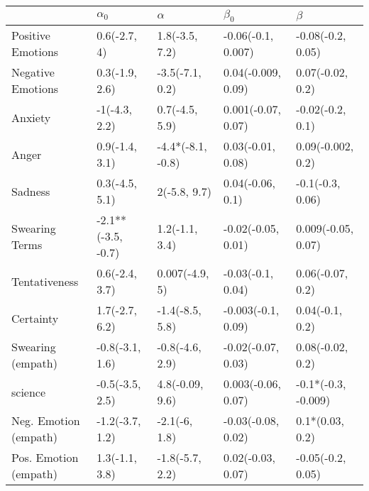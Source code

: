 \begin{tabular}{lllll}
\toprule
{} &          $\alpha_0$ &           $\alpha$ &           $\beta_0$ &              $\beta$ \\
\midrule
Positive Emotions     &        0.6(-2.7, 4) &     1.8(-3.5, 7.2) &  -0.06(-0.1, 0.007) &    -0.08(-0.2, 0.05) \\
Negative Emotions     &      0.3(-1.9, 2.6) &    -3.5(-7.1, 0.2) &  0.04(-0.009, 0.09) &     0.07(-0.02, 0.2) \\
Anxiety               &       -1(-4.3, 2.2) &     0.7(-4.5, 5.9) &  0.001(-0.07, 0.07) &     -0.02(-0.2, 0.1) \\
Anger                 &      0.9(-1.4, 3.1) &  -4.4*(-8.1, -0.8) &   0.03(-0.01, 0.08) &    0.09(-0.002, 0.2) \\
Sadness               &      0.3(-4.5, 5.1) &       2(-5.8, 9.7) &    0.04(-0.06, 0.1) &     -0.1(-0.3, 0.06) \\
Swearing Terms        &  -2.1**(-3.5, -0.7) &     1.2(-1.1, 3.4) &  -0.02(-0.05, 0.01) &   0.009(-0.05, 0.07) \\
Tentativeness         &      0.6(-2.4, 3.7) &     0.007(-4.9, 5) &   -0.03(-0.1, 0.04) &     0.06(-0.07, 0.2) \\
Certainty             &      1.7(-2.7, 6.2) &    -1.4(-8.5, 5.8) &  -0.003(-0.1, 0.09) &      0.04(-0.1, 0.2) \\
Swearing (empath)     &     -0.8(-3.1, 1.6) &    -0.8(-4.6, 2.9) &  -0.02(-0.07, 0.03) &     0.08(-0.02, 0.2) \\
science               &     -0.5(-3.5, 2.5) &    4.8(-0.09, 9.6) &  0.003(-0.06, 0.07) &  -0.1*(-0.3, -0.009) \\
Neg. Emotion (empath) &     -1.2(-3.7, 1.2) &      -2.1(-6, 1.8) &  -0.03(-0.08, 0.02) &      0.1*(0.03, 0.2) \\
Pos. Emotion (empath) &      1.3(-1.1, 3.8) &    -1.8(-5.7, 2.2) &   0.02(-0.03, 0.07) &    -0.05(-0.2, 0.05) \\
\bottomrule
\end{tabular}
